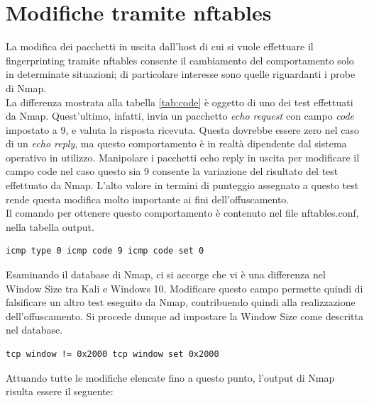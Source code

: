 \section{Modifiche tramite nftables}
La modifica dei pacchetti in uscita dall'host di cui si vuole effettuare il fingerprinting tramite nftables consente il cambiamento del comportamento solo in determinate situazioni; di particolare interesse sono quelle riguardanti i probe di Nmap.
\\
La differenza mostrata alla tabella \ref{tab:code} è oggetto di uno dei test effettuati da Nmap. Quest'ultimo, infatti, invia un pacchetto \textit{echo request} con campo \textit{code} impostato a 9, e valuta la risposta ricevuta.
Questa dovrebbe essere zero nel caso di un \textit{echo reply}, ma questo comportamento è in realtà dipendente dal sistema operativo in utilizzo.
Manipolare i pacchetti echo reply in uscita per modificare il campo code nel caso questo sia 9 consente la variazione del risultato del test effettuato da Nmap. L'alto valore in termini di punteggio assegnato a questo test rende questa modifica molto importante ai fini dell'offuscamento.\\
Il comando per ottenere questo comportamento è contenuto nel file nftables.conf, nella tabella output.

\begin{lstlisting}[caption={Modifica del campo code in caso di test Nmap}, label=codice_icmp]
	icmp type 0 icmp code 9 icmp code set 0
\end{lstlisting}

Esaminando il database di Nmap, ci si accorge che vi è una differenza nel Window Size tra Kali e Windows 10. Modificare questo campo permette quindi di falsificare un altro test eseguito da Nmap, contribuendo quindi alla realizzazione dell'offuscamento.
Si procede dunque ad impostare la Window Size come descritta nel database.

\begin{lstlisting}[caption={Modifica della Window Size}, caption=listingsize]
	tcp window != 0x2000 tcp window set 0x2000
\end{lstlisting}

Attuando tutte le modifiche elencate fino a questo punto, l'output di Nmap risulta essere il seguente:

